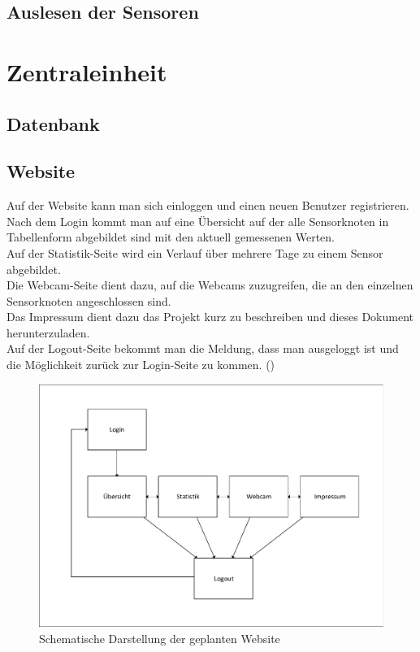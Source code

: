 \subsection{Auslesen der Sensoren}

\section{Zentraleinheit}
\subsection{Datenbank}
\subsection{Website}

Auf der Website kann man sich einloggen und einen neuen Benutzer registrieren.
Nach dem Login kommt man auf eine Übersicht auf der alle Sensorknoten in
Tabellenform abgebildet sind mit den aktuell gemessenen Werten. \\
Auf der Statistik-Seite wird ein Verlauf über mehrere Tage zu einem Sensor
abgebildet.\\
Die Webcam-Seite dient dazu, auf die Webcams zuzugreifen, die an den einzelnen Sensorknoten
angeschlossen sind.\\
Das Impressum dient dazu das Projekt kurz zu beschreiben und dieses Dokument
herunterzuladen.\\
Auf der Logout-Seite bekommt man die Meldung, dass man ausgeloggt ist und die
Möglichkeit zurück zur Login-Seite zu kommen.
()


\begin{figure} [htb]
\begin{centering}
\includegraphics[scale=0.8]{Bilder/struktur_website_einfach.pdf}
\caption[Schematische Darstellung der geplanten Website]{Schematische
Darstellung der geplanten Website}
\label{Darstellung_Website_einfach}
\end{centering}
\end{figure}



